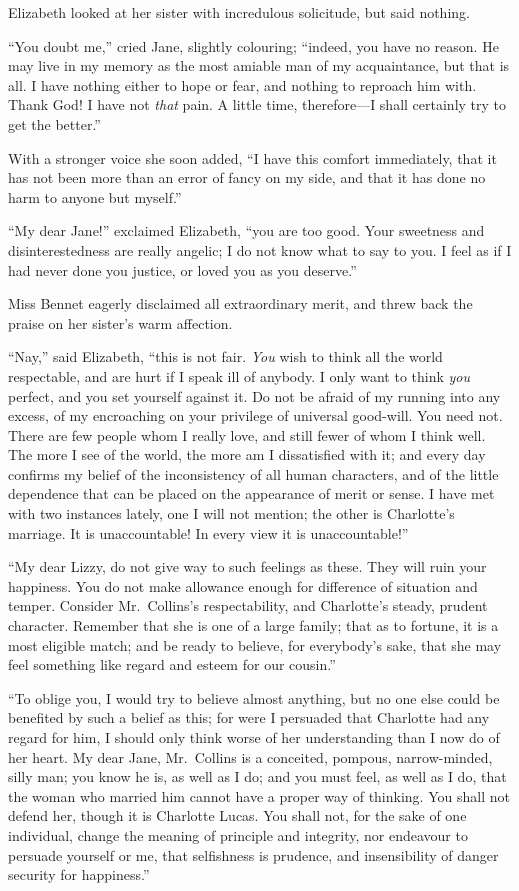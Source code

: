 Elizabeth looked at her sister with incredulous solicitude, but
said nothing.

``You doubt me,'' cried Jane, slightly colouring; ``indeed, you
have no reason.  He may live in my memory as the most amiable
man of my acquaintance, but that is all.  I have nothing either
to hope or fear, and nothing to reproach him with.  Thank God! I
have not \emph{that} pain.  A little time, therefore---I shall certainly
try to get the better.''

With a stronger voice she soon added, ``I have this comfort
immediately, that it has not been more than an error of fancy on
my side, and that it has done no harm to anyone but myself.''

``My dear Jane!'' exclaimed Elizabeth, ``you are too good.  Your
sweetness and disinterestedness are really angelic; I do not know
what to say to you.  I feel as if I had never done you justice, or
loved you as you deserve.''

Miss Bennet eagerly disclaimed all extraordinary merit, and
threw back the praise on her sister's warm affection.

``Nay,'' said Elizabeth, ``this is not fair.  \emph{You} wish to think all
the world respectable, and are hurt if I speak ill of anybody.  I
only want to think \emph{you} perfect, and you set yourself against it.
Do not be afraid of my running into any excess, of my encroaching
on your privilege of universal good-will.  You need not.  There
are few people whom I really love, and still fewer of whom I think
well.  The more I see of the world, the more am I dissatisfied
with it; and every day confirms my belief of the inconsistency of
all human characters, and of the little dependence that can be
placed on the appearance of merit or sense.  I have met with two
instances lately, one I will not mention; the other is Charlotte's
marriage.  It is unaccountable!  In every view it is unaccountable!''

``My dear Lizzy, do not give way to such feelings as these.  They
will ruin your happiness.  You do not make allowance enough
for difference of situation and temper.  Consider Mr.\ Collins's
respectability, and Charlotte's steady, prudent character.
Remember that she is one of a large family; that as to fortune,
it is a most eligible match; and be ready to believe, for
everybody's sake, that she may feel something like regard and
esteem for our cousin.''

``To oblige you, I would try to believe almost anything, but no
one else could be benefited by such a belief as this; for were I
persuaded that Charlotte had any regard for him, I should only
think worse of her understanding than I now do of her heart.
My dear Jane, Mr.\ Collins is a conceited, pompous, narrow-minded,
silly man; you know he is, as well as I do; and you must feel,
as well as I do, that the woman who married him cannot have a
proper way of thinking.  You shall not defend her, though it is
Charlotte Lucas.  You shall not, for the sake of one individual,
change the meaning of principle and integrity, nor endeavour to
persuade yourself or me, that selfishness is prudence, and
insensibility of danger security for happiness.''

